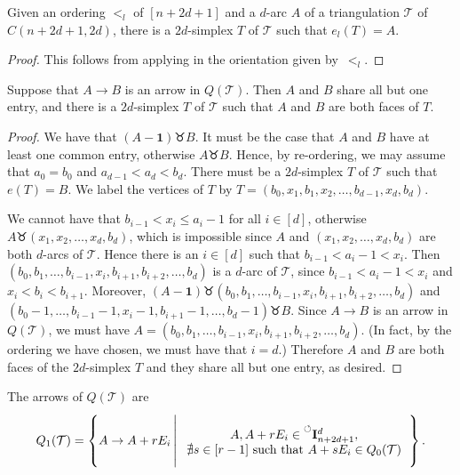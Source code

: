 \documentclass[ALCO,Unicode,published]{cedram}
\newcommand{\nonconsec}[2]{\prescript{\circlearrowleft}{}{\mathbf{I}_{#1}^{#2}}}
\newcommand{\st}{\,\middle\vert\,} %
\newcommand{\set}[1]{\left\{#1\right\}} %
\newcommand{\onevec}{\mathbf{1}} %
\newcommand{\ivec}{E_{i}} %
\newcommand{\rvec}{r\ivec} %
\newcommand{\svec}{s\ivec}
\newcommand{\swr}{\taurus} %
\begin{document}
\begin{lemma}\label{lem:find_2d_simplex}
Given an ordering $<_{l}$ of $[n + 2d + 1]$ and a $d$-arc $A$ of a triangulation $\mathcal{T}$ of $C(n + 2d + 1,2d)$, there is a $2d$-simplex $T$ of $\mathcal{T}$ such that $e_{l}(T) = A$.
\end{lemma}
\begin{proof}
This follows from applying \cite[Proposition 2.13]{ot} in the orientation given by~$<_{l}$.
\end{proof}

\begin{prop}\label{prop:all_but_one_vertex}
Suppose that $A \rightarrow B$ is an arrow in $Q(\mathcal{T})$. Then $A$ and $B$ share all but one entry, and there is a $2d$-simplex $T$ of $\mathcal{T}$ such that $A$ and $B$ are both faces of $T$.
\end{prop}
\begin{proof}
We have that $(A - \onevec) \swr B$. It must be the case that $A$ and $B$ have at least one common entry, otherwise $A \swr B$. Hence, by re-ordering, we may assume that $a_{0} = b_{0}$ and $a_{d - 1} < a_{d} < b_{d}$. There must be a $2d$-simplex $T$ of $\mathcal{T}$ such that $e(T) = B$. We label the vertices of $T$ by $T = (b_{0}, x_{1}, b_{1}, x_{2}, \dots, b_{d - 1}, x_{d}, b_{d})$.

\sloppy We cannot have that $b_{i - 1} < x_{i} \leq a_{i} - 1$ for all $i \in [d]$, otherwise $A \swr (x_{1}, x_{2}, \dots, x_{d}, b_{d})$, which is impossible since $A$ and $(x_{1}, x_{2}, \dots, x_{d}, b_{d})$ are both $d$-arcs of $\mathcal{T}$. Hence there is an $i \in [d]$ such that $b_{i - 1} < a_{i} - 1 < x_{i}$. Then $(b_{0}, b_{1}, \dots, b_{i - 1}, x_{i}, b_{i + 1}, b_{i + 2}, \dots, b_{d})$ is a $d$-arc of $\mathcal{T}$, since $b_{i - 1} < a_{i} - 1 < x_{i}$ and $x_{i} < b_{i} < b_{i + 1}$. Moreover, $(A - \onevec) \swr (b_{0}, b_{1}, \dots, b_{i - 1}, x_{i}, b_{i + 1}, b_{i + 2}, \dots, b_{d})$ and $(b_{0} - 1, \dots, b_{i - 1} - 1, x_{i} - 1, b_{i + 1} - 1, \dots, b_{d} - 1) \swr B$. Since $A \rightarrow B$ is an arrow in $Q(\mathcal{T})$, we must have $A = (b_{0}, b_{1}, \dots, b_{i - 1}, x_{i}, b_{i + 1}, b_{i + 2}, \dots, b_{d})$. (In fact, by the ordering we have chosen, we must have that $i = d$.) Therefore $A$ and $B$ are both faces of the $2d$-simplex $T$ and they share all but one entry, as desired.
\end{proof}

\begin{coro}\label{cor:quiv_desc}
The arrows of $Q(\mathcal{T})$ are \[Q_{1}(\mathcal{T}) = \set{A \rightarrow A + \rvec \st \parbox{6.5cm}{\begin{center}$A, A + \rvec \in \nonconsec{n + 2d + 1}{d},$ $\nexists s \in [r - 1] \text{ such that } A + \svec \in Q_{0}(\mathcal{T})$\end{center}}}.\]
\end{coro}
\end{document}
